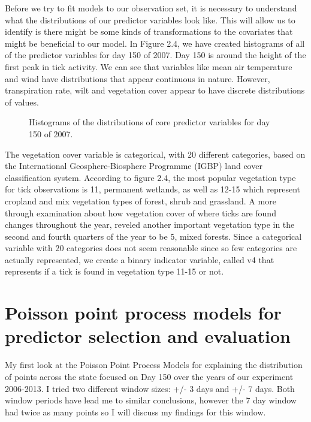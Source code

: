 Before we try to fit models to our observation set, it is necessary to understand what the distributions of our predictor variables look like. This will allow us to identify is there might be some kinds of transformations to the covariates that might be beneficial to our model. In Figure 2.4, we have created histograms of all of the predictor variables for day 150 of 2007. Day 150 is around the height of the first peak in tick activity. We can see that variables like mean air temperature and wind have distributions that appear continuous in nature. However, transpiration rate, wilt and vegetation cover appear to have discrete distributions of values. 

\begin{figure} [!ht]
\centerline{}
\caption{Histograms of the distributions of core predictor  variables for day 150 of 2007. }
\label{fig6}
\end{figure}

\noindent The vegetation cover variable is categorical, with 20 different categories, based on the International Geosphere-Biosphere Programme (IGBP) land cover classification system. According to figure 2.4, the most popular vegetation type for tick observations is 11, permanent wetlands, as well as 12-15 which represent cropland and mix vegetation types of forest, shrub and grassland. A more through examination about how vegetation cover of where ticks are found changes throughout the year, reveled another important vegetation type in the second and fourth quarters of the year to be 5, mixed forests. Since a categorical variable with 20 categories does not seem reasonable since so few categories are actually represented, we create a binary indicator variable, called v4 that represents if a tick is found in vegetation type 11-15 or not. 


\section{Poisson point process models for predictor selection and evaluation}


\noindent My first look at the Poisson Point Process Models for explaining the distribution of points across the state focused on Day 150 over the years of our experiment 2006-2013. I tried two different window sizes: +/- 3 days and +/- 7 days. Both window periods have lead me to similar conclusions, however the 7 day window had twice as many points so I will discuss my findings for this window.\newline

